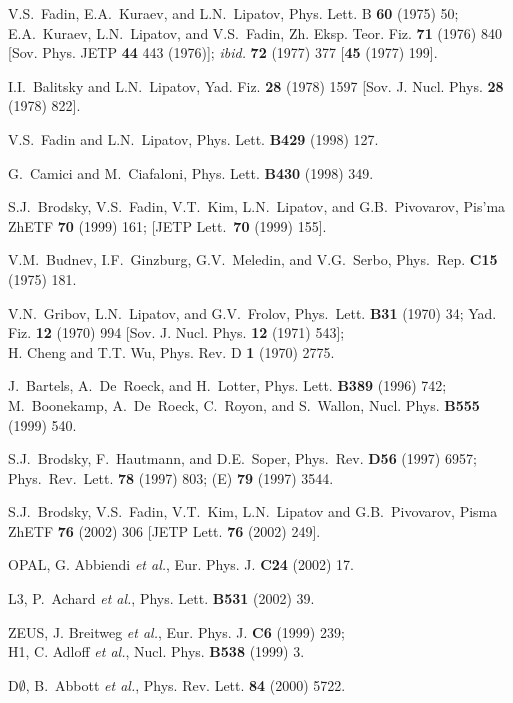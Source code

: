 \documentclass{pic2012}
\begin{document}
\begin{thebibliography}{0}

   V.S.~Fadin, E.A.~Kuraev, and L.N.~Lipatov,
Phys. Lett. B {\bf60}  (1975) 50; \\
E.A.~Kuraev, L.N.~Lipatov, and V.S.~Fadin, Zh. Eksp. Teor. Fiz.
{\bf 71} (1976) 840 [Sov. Phys. JETP {\bf 44} 443 (1976)]; {\it
ibid.} {\bf 72} (1977) 377 [{\bf 45} (1977) 199].

I.I.~Balitsky and L.N.~Lipatov, Yad. Fiz. {\bf28} (1978) 1597
[Sov. J. Nucl. Phys. {\bf28} (1978) 822].

V.S.~Fadin and L.N.~Lipatov, Phys. Lett. {\bf B429} (1998) 127.

  G.~Camici and M.~Ciafaloni, Phys. Lett.
{\bf B430} (1998) 349.

  S.J.~Brodsky, V.S.~Fadin, V.T.~Kim,
L.N.~Lipatov, and G.B.~Pivovarov, Pis'ma ZhETF {\bf70} (1999) 161;
[JETP Lett.\ {\bf 70} (1999) 155].


V.M.~Budnev, I.F.~Ginzburg, G.V.~Meledin, and V.G.~Serbo,
Phys.~Rep. {\bf C15} (1975) 181.

 V.N.~Gribov, L.N.~Lipatov, and G.V.~Frolov,
Phys.~Lett. {\bf B31} (1970) 34; Yad. Fiz. {\bf12} (1970) 994
[Sov. J. Nucl. Phys. {\bf 12} (1971) 543]; \\
H. Cheng and T.T. Wu, Phys. Rev. D {\bf1} (1970) 2775.

J.~Bartels, A.~De~Roeck, and H.~Lotter,
Phys. Lett. {\bf B389} (1996) 742;\\
M.~Boonekamp, A.~De~Roeck, C.~Royon, and S.~Wallon, Nucl. Phys.
{\bf B555} (1999) 540.

  S.J.~Brodsky, F.~Hautmann, and D.E.~Soper,
Phys.~Rev. {\bf D56} (1997) 6957; Phys.~Rev.~Lett. {\bf78} (1997)
803; (E) {\bf79} (1997) 3544.

S.J.~Brodsky, V.S.~Fadin, V.T.~Kim, L.N.~Lipatov and
G.B.~Pivovarov, Pisma ZhETF  {\bf76} (2002) 306 [JETP Lett. {\bf
76} (2002) 249].

OPAL, G. Abbiendi {\it et al.},  Eur. Phys. J. {\bf C24} (2002)
17.

 L3, P.~Achard {\it et al.},
Phys. Lett. {\bf B531} (2002) 39.

ZEUS, J. Breitweg {\it et al.},
Eur. Phys. J. {\bf C6} (1999) 239; \\
H1, C. Adloff {\it et al.}, Nucl. Phys. {\bf B538} (1999) 3.

D$\emptyset$, B.~Abbott {\it et al.}, Phys. Rev. Lett. {\bf 84}
(2000) 5722.



\end{thebibliography}
\end{document}
